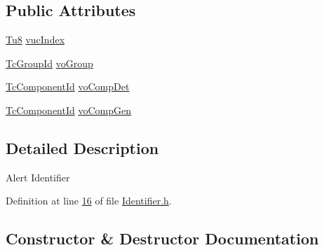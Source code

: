 \subsection*{Public Attributes}
\begin{DoxyCompactItemize}
\item 
\mbox{\hyperlink{namespace_g_n_common_a7939e251ddbf5d3a31832dcfdc8bde39}{Tu8}} \mbox{\hyperlink{class_g_n_common_1_1_n_notification_1_1_tc_identifier_a704ac106036ca2d6b4fae77be75e7913}{vuc\+Index}}
\item 
\mbox{\hyperlink{namespace_g_n_common_1_1_n_notification_af29017ad6ed59156beabc385a91db18e}{Tc\+Group\+Id}} \mbox{\hyperlink{class_g_n_common_1_1_n_notification_1_1_tc_identifier_afcf493852b92439dca37c671b549c2d3}{vo\+Group}}
\item 
\mbox{\hyperlink{namespace_g_n_common_1_1_n_notification_ab468f440599e6d5a51d887dfa55b06b3}{Tc\+Component\+Id}} \mbox{\hyperlink{class_g_n_common_1_1_n_notification_1_1_tc_identifier_a226babb1936c6e0841174fd1baac3476}{vo\+Comp\+Det}}
\item 
\mbox{\hyperlink{namespace_g_n_common_1_1_n_notification_ab468f440599e6d5a51d887dfa55b06b3}{Tc\+Component\+Id}} \mbox{\hyperlink{class_g_n_common_1_1_n_notification_1_1_tc_identifier_a259c70f5d04a2cb6e8c674a07f903aff}{vo\+Comp\+Gen}}
\end{DoxyCompactItemize}


\subsection{Detailed Description}
Alert Identifier 

Definition at line \mbox{\hyperlink{_identifier_8h_source_l00016}{16}} of file \mbox{\hyperlink{_identifier_8h_source}{Identifier.\+h}}.



\subsection{Constructor \& Destructor Documentation}
\mbox{\label{class_g_n_common_1_1_n_notification_1_1_tc_identifier_a267c27d2c658da02dd9de307056e5957}} 
